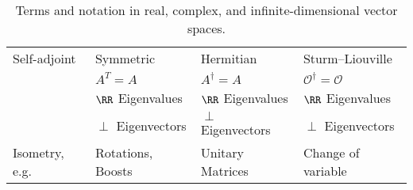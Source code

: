 \begin{table}
\begin{tabular}{ @{} llll @{} }
        Self-adjoint
            & Symmetric
            & Hermitian
            & Sturm--Liouville
        \\
            & $A^T = A$
            & $A^\dag = A$
            & $\mathcal O^\dag = \mathcal O$
        \\
            & $\RR$ Eigenvalues
            & $\RR$ Eigenvalues
            & $\RR$ Eigenvalues
        \\
            & $\perp$ Eigenvectors
            & $\perp$ Eigenvectors
            & $\perp$ Eigenvectors
        \\
        Isometry, e.g.
            & Rotations, Boosts
            & Unitary Matrices
            & Change of variable
        \\ \bottomrule
    \end{tabular}
    \caption{
        Terms and notation in real, complex, and infinite-dimensional vector spaces. 
        \label{table:vectors:conventions}
  }
\end{table}